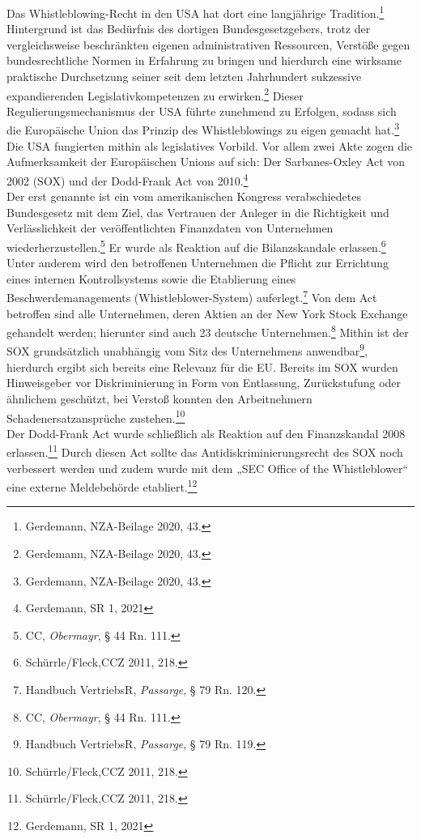 Das Whistleblowing-Recht in den USA hat dort eine langjährige Tradition.\footnote{Gerdemann, NZA-Beilage 2020, 43.}
Hintergrund ist das Bedürfnis des dortigen Bundesgesetzgebers, trotz der vergleichsweise beschränkten eigenen administrativen Ressourcen, Verstöße gegen bundesrechtliche Normen in Erfahrung zu bringen und hierdurch eine wirksame praktische Durchsetzung seiner seit dem letzten Jahrhundert sukzessive expandierenden Legislativkompetenzen zu erwirken.\footnote{Gerdemann, NZA-Beilage 2020, 43.}
Dieser Regulierungsmechanismus der USA führte zunehmend zu Erfolgen, sodass sich die Europäische Union das Prinzip des Whistleblowings zu eigen gemacht hat.\footnote{Gerdemann, NZA-Beilage 2020, 43.}
Die USA fungierten mithin als legislatives Vorbild.
Vor allem zwei Akte zogen die Aufmerksamkeit der Europäischen Unions auf sich: Der Sarbanes-Oxley Act von 2002 (SOX) und der Dodd-Frank Act von 2010.\footnote{Gerdemann, SR 1, 2021}\\
Der erst genannte ist ein vom amerikanischen Kongress verabschiedetes Bundesgesetz mit dem Ziel, das Vertrauen der Anleger in die Richtigkeit und Verlässlichkeit der veröffentlichten Finanzdaten von Unternehmen wiederherzustellen.\footnote{CC, \textit{Obermayr}, § 44 Rn. 111.}
Er wurde als Reaktion auf die Bilanzskandale erlassen.\footnote{Schürrle/Fleck,CCZ 2011, 218.}
Unter anderem wird den betroffenen Unternehmen die Pflicht zur Errichtung eines internen Kontrollsystems sowie die Etablierung eines Beschwerdemanagements (Whistleblower-System) auferlegt.\footnote{Handbuch VertriebsR, \textit{Passarge}, § 79 Rn. 120.}
Von dem Act betroffen sind alle Unternehmen, deren Aktien an der New York Stock Exchange gehandelt werden; hierunter sind auch 23 deutsche Unternehmen.\footnote{CC, \textit{Obermayr}, § 44 Rn. 111.}
Mithin ist der SOX grundsätzlich unabhängig vom Sitz des Unternehmens anwendbar\footnote{Handbuch VertriebsR, \textit{Passarge}, § 79 Rn. 119.}, hierdurch ergibt sich bereits eine Relevanz für die EU.
Bereits im SOX wurden Hinweisgeber vor Diskriminierung in Form von Entlassung, Zurückstufung oder ähnlichem geschützt, bei Verstoß konnten den Arbeitnehmern Schadenersatzansprüche zustehen.\footnote{Schürrle/Fleck,CCZ 2011, 218.}\\
Der Dodd-Frank Act wurde schließlich als Reaktion auf den Finanzskandal 2008 erlassen.\footnote{Schürrle/Fleck,CCZ 2011, 218.}
Durch diesen Act sollte das Antidiskriminierungsrecht des SOX noch verbessert werden und zudem wurde mit dem „SEC Office of the Whistleblower“ eine externe Meldebehörde etabliert.\footnote{Gerdemann, SR 1, 2021}
